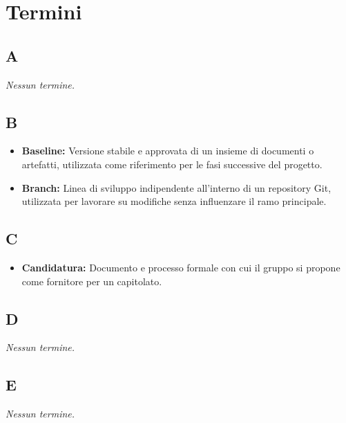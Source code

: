 \section{Termini}

{}
\subsection*{A}
\textit{Nessun termine.}

{}
\subsection*{B}
\begin{itemize}[leftmargin=*]
    \item \textbf{Baseline:} Versione stabile e approvata di un insieme di documenti o artefatti, utilizzata come riferimento per le fasi successive del progetto.
    \item \textbf{Branch:} Linea di sviluppo indipendente all'interno di un repository Git, utilizzata per lavorare su modifiche senza influenzare il ramo principale.
\end{itemize}

{}
\subsection*{C}
\begin{itemize}[leftmargin=*]
    \item \textbf{Candidatura:} Documento e processo formale con cui il gruppo si propone come fornitore per un capitolato.
\end{itemize}

{}
\subsection*{D}
\textit{Nessun termine.}

{}
\subsection*{E}
\textit{Nessun termine.}

